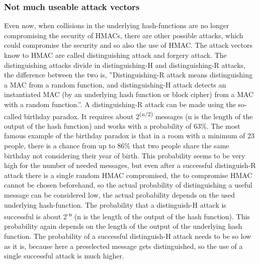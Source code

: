 \subsubsection{Not much useable attack vectors}
Even now, when collisions in the underlying hash-functions are no longer compromising the security of HMACs, there are other possible attacks, which could compromise the security and so also the use of HMAC. The attack vectors know to HMAC are called distinguishing attack and forgery attack. The distinguishing attacks divide in distinguishing-H and distinguishing-R attacks, the difference between the two is, ''Distinguishing-R attack means distinguishing a MAC from a random function, and distinguishing-H attack detects an instantiated MAC (by an underlying hash function or block cipher) from a MAC with a random function.''\cite{ATT1}. A distinguishing-R attack can be made using the so-called birthday paradox. It requires about 2\textsuperscript{(n$/$2)} messages (n is the length of the output of the hash function) and works with a probability of 63\%\cite{ATT1}. The most famous example of the birthday paradox is that in a room with a minimum of 23 people, there is a chance from up to 86\% that two people share the same birthday not considering their year of birth. This probability seems to be very high for the number of needed messages, but even after a successful distinguish-R attack there is a single random HMAC compromised, the to compromise HMAC cannot be chosen beforehand, so the actual probability of distinguishing a useful message can be considered low, the actual probability depends on the used underlying hash-function. The probability that a distinguish-H attack is successful is about 2\textsuperscript{-n}\cite{ATT1} (n is the length of the output of the hash function). This probability again depends on the length of the output of the underlying hash function. The probability of a successful distinguish-H attack needs to be so low as it is, because here a preselected message gets distinguished, so the use of a single successful attack is much higher. 
